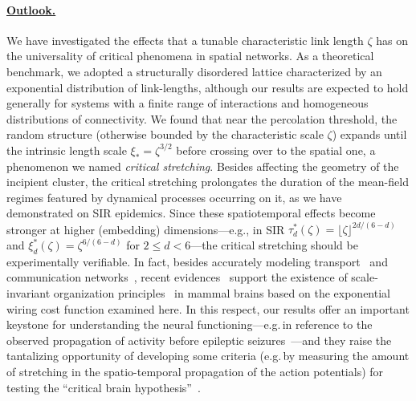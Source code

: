 \documentclass[aps, groupedaddress, superscriptaddress, prl, reprint]{revtex4-1}
\begin{document}
\paragraph*{\underline{Outlook.}\!\!\!} 
We have investigated the effects that a tunable characteristic link length $\zeta$ has on the universality of critical phenomena in spatial networks.
As a theoretical benchmark, we adopted a structurally disordered lattice characterized by an exponential distribution of link-lengths, although our results are expected to hold generally for systems with a finite range of interactions and homogeneous distributions of connectivity. 
We found that near the percolation threshold, the random structure (otherwise bounded by the characteristic scale $\zeta$) expands until the intrinsic length scale $\xi_*=\zeta^{3/2}$ before crossing over to the spatial one, a phenomenon we named {\em critical stretching}. 
Besides affecting the geometry of the incipient cluster, the critical stretching prolongates the duration of the mean-field regimes featured by dynamical processes occurring on it, as we have demonstrated on SIR epidemics.
Since these spatiotemporal effects become stronger at higher (embedding) dimensions---e.g., in SIR $\tau_d^*(\zeta)=\lfloor\zeta\rfloor^{2d/(6-d)}$ and $\xi_d^*(\zeta)=\zeta^{6/(6-d)}$ for $2\leq d<6$---the critical stretching should be experimentally verifiable. 
In fact, besides accurately modeling transport~\cite{Hal014,Dan016} and communication networks~\cite{Wire009,Zeg996,Yook2002,Watts2002}, recent evidences~\cite{Brain1,Brain2,Brain3} support the existence of scale-invariant organization principles~\cite{Brain3} in mammal brains based on the exponential wiring cost function examined here.
In this respect, our results offer an important keystone for understanding the neural functioning---e.g.\,in reference to the observed propagation of activity before epileptic seizures~\cite{Vlad011}---and they raise the tantalizing opportunity of developing some criteria (e.g.\,by measuring the amount of stretching in the spatio-temporal propagation of the action potentials) for testing the ``critical brain hypothesis''~\cite{Mor013}.
\end{document}

